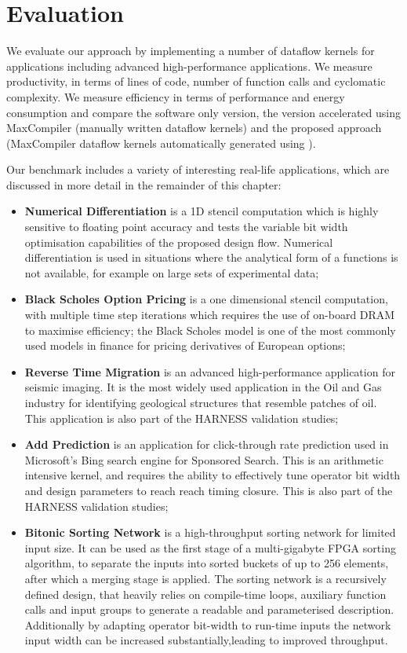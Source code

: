 \chapter{Evaluation}
\label{sec:evaluation}

We evaluate our approach by implementing a number of dataflow kernels
for applications including advanced high-performance applications. We
measure productivity, in terms of lines of code, number of function
calls and cyclomatic complexity. We measure efficiency in terms of
performance and energy consumption and compare the software only
version, the version accelerated using MaxCompiler (manually written
dataflow kernels) and the proposed approach (MaxCompiler dataflow
kernels automatically generated using \fastc{}).

\label{sec:benchmark}

Our benchmark includes a variety of interesting real-life
applications, which are discussed in more detail in the remainder of
this chapter:
\begin{itemize}
\item \textbf{Numerical Differentiation} is a 1D stencil computation which
  is highly sensitive to floating point accuracy and tests the
  variable bit width optimisation capabilities of the proposed design
  flow. Numerical differentiation is used in situations where the
  analytical form of a functions is not available, for example on
  large sets of experimental data;
\item \textbf{Black Scholes Option Pricing} is a one dimensional
    stencil computation, with multiple time step iterations which
    requires the use of on-board DRAM to maximise efficiency; the Black
    Scholes model is one of the most commonly used models in finance for
    pricing derivatives of European options;
\item \textbf{Reverse Time Migration} is an advanced high-performance
  application for seismic imaging. It is the most widely used
  application in the Oil and Gas industry for identifying geological
  structures that resemble patches of oil. This application is also
  part of the HARNESS validation studies;
\item \textbf{Add Prediction} is an application for click-through rate
  prediction used in Microsoft's Bing search engine for Sponsored
  Search. This is an arithmetic intensive kernel, and requires the
  ability to effectively tune operator bit width and design parameters
  to reach reach timing closure. This is also part of the HARNESS
  validation studies;
\item \textbf{Bitonic Sorting Network} is a high-throughput sorting
  network for limited input size. It can be used as the first stage of
  a multi-gigabyte FPGA sorting algorithm, to separate the inputs into
  sorted buckets of up to 256 elements, after which a merging stage is
  applied. The sorting network is a recursively defined design, that
  heavily relies on compile-time loops, auxiliary function calls and
  input groups to generate a readable and parameterised
  description. Additionally by adapting operator bit-width to run-time
  inputs the network input width can be increased
  substantially,leading to improved throughput.
\end{itemize}

